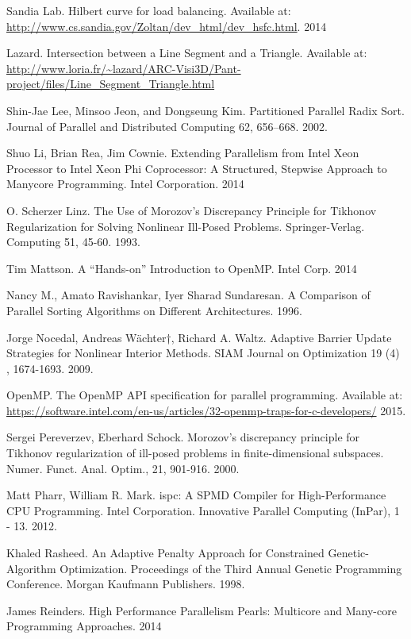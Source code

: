 \documentclass[times,12pt]{ACME2015article}
\begin{document}
\begin{thebibliography}{99}
Sandia Lab. Hilbert curve for load balancing. Available at: \url{http://www.cs.sandia.gov/Zoltan/dev_html/dev_hsfc.html}. 2014

Lazard. Intersection between a Line Segment and a Triangle. Available at: \url{http://www.loria.fr/~lazard/ARC-Visi3D/Pant-project/files/Line_Segment_Triangle.html}

Shin-Jae Lee, Minsoo Jeon, and Dongseung Kim. Partitioned Parallel Radix Sort. Journal of Parallel and Distributed Computing 62, 656–668. 2002.

Shuo Li, Brian Rea, Jim Cownie. Extending Parallelism from Intel Xeon Processor to Intel Xeon Phi Coprocessor: A Structured, Stepwise Approach to Manycore Programming. Intel Corporation. 2014


O. Scherzer Linz. The Use of Morozov's Discrepancy Principle for Tikhonov Regularization for Solving Nonlinear Ill-Posed Problems. Springer-Verlag. Computing 51, 45-60. 1993.

Tim Mattson. A “Hands-on” Introduction to OpenMP. Intel Corp. 2014

Nancy M., Amato Ravishankar, Iyer Sharad Sundaresan. A Comparison of Parallel Sorting Algorithms on Different Architectures. 1996.


Jorge Nocedal, Andreas Wächter†, Richard A. Waltz. Adaptive Barrier Update Strategies for Nonlinear Interior Methods. SIAM Journal on Optimization 19 (4) , 1674-1693. 2009.

OpenMP. The OpenMP API specification for parallel programming. Available at: \url{https://software.intel.com/en-us/articles/32-openmp-traps-for-c-developers/} 2015.

Sergei Pereverzev, Eberhard Schock. Morozov's discrepancy principle for Tikhonov regularization of ill-posed problems in finite-dimensional subspaces. Numer. Funct. Anal. Optim., 21, 901-916. 2000.

Matt Pharr, William R. Mark. ispc: A SPMD Compiler for High-Performance CPU Programming. Intel Corporation. Innovative Parallel Computing (InPar), 1 - 13. 2012. 

Khaled Rasheed. An Adaptive Penalty Approach for Constrained Genetic-Algorithm Optimization. Proceedings of the Third Annual Genetic Programming Conference. Morgan Kaufmann Publishers. 1998.

James Reinders. High Performance Parallelism Pearls: Multicore and Many-core Programming Approaches. 2014


\end{thebibliography}
\end{document}
